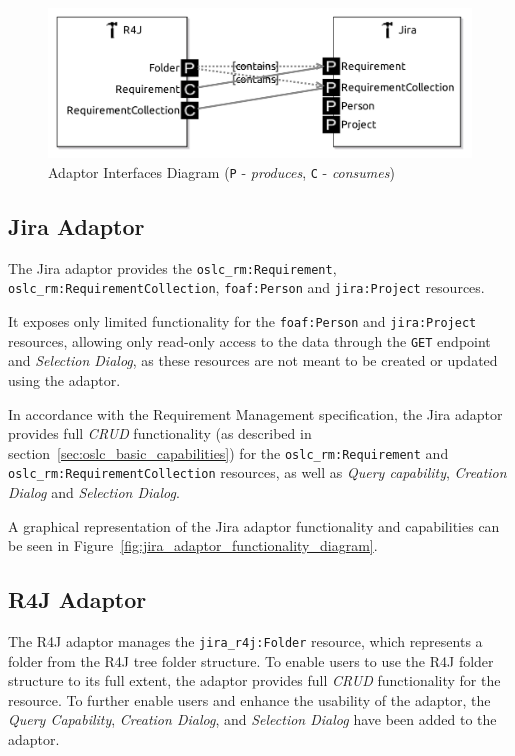 \begin{figure}[h]
  \centering
  \includegraphics[width= .8\linewidth]{figures/adaptors_interface.jpg}
  \caption{Adaptor Interfaces Diagram (\texttt{P} - \emph{produces}, \texttt{C} - \emph{consumes})}
  \label{fig:adaptor_interfaces_diagram}
\end{figure}

\subsection*{Jira Adaptor}
The Jira adaptor provides the \texttt{oslc\_rm:Requirement}, \texttt{oslc\_rm:RequirementCollection}, \texttt{foaf:Person} and \texttt{jira:Project} resources.

It exposes only limited functionality for the \texttt{foaf:Person} and \texttt{jira:Project} resources, allowing only read-only access to the data through the \texttt{GET} endpoint and \emph{Selection Dialog}, as these resources are not meant to be created or updated using the adaptor.

In accordance with the Requirement Management specification, the Jira adaptor provides full \emph{CRUD} functionality (as described in section \ref{sec:oslc_basic_capabilities}) for the \texttt{oslc\_rm:Requirement} and \texttt{oslc\_rm:RequirementCollection} resources, as well as \emph{Query capability}, \emph{Creation Dialog} and \emph{Selection Dialog}.

A graphical representation of the Jira adaptor functionality and capabilities can be seen in Figure \ref{fig:jira_adaptor_functionality_diagram}.

\subsection*{R4J Adaptor}
The R4J adaptor manages the \texttt{jira\_r4j:Folder} resource, which represents a folder from the R4J tree folder structure. To enable users to use the R4J folder structure to its full extent, the adaptor provides full \emph{CRUD} functionality for the resource. To further enable users and enhance the usability of the adaptor, the \emph{Query Capability}, \emph{Creation Dialog}, and \emph{Selection Dialog} have been added to the adaptor.

